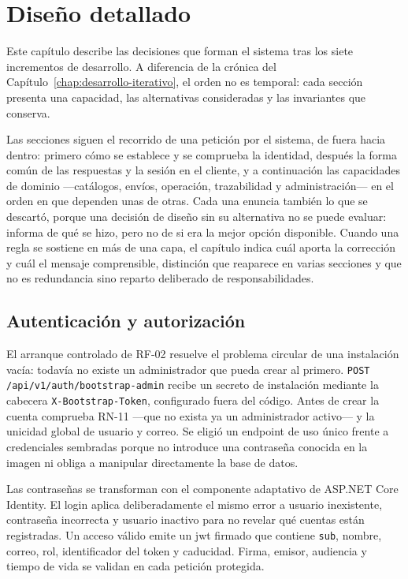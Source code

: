 \chapter{Diseño detallado}
\label{chap:diseno-detallado}

Este capítulo describe las decisiones que forman el sistema tras los siete incrementos de desarrollo. A diferencia de la crónica del Capítulo~\ref{chap:desarrollo-iterativo}, el orden no es temporal: cada sección presenta una capacidad, las alternativas consideradas y las invariantes que conserva.

Las secciones siguen el recorrido de una petición por el sistema, de fuera hacia dentro: primero cómo se establece y se comprueba la identidad, después la forma común de las respuestas y la sesión en el cliente, y a continuación las capacidades de dominio ---catálogos, envíos, operación, trazabilidad y administración--- en el orden en que dependen unas de otras. Cada una enuncia también lo que se descartó, porque una decisión de diseño sin su alternativa no se puede evaluar: informa de qué se hizo, pero no de si era la mejor opción disponible. Cuando una regla se sostiene en más de una capa, el capítulo indica cuál aporta la corrección y cuál el mensaje comprensible, distinción que reaparece en varias secciones y que no es redundancia sino reparto deliberado de responsabilidades.

\section{Autenticación y autorización}

El arranque controlado de RF-02 resuelve el problema circular de una instalación vacía: todavía no existe un administrador que pueda crear al primero. \texttt{POST /api/v1/auth/bootstrap-admin} recibe un secreto de instalación mediante la cabecera \texttt{X-Bootstrap-Token}, configurado fuera del código. Antes de crear la cuenta comprueba RN-11 ---que no exista ya un administrador activo--- y la unicidad global de usuario y correo. Se eligió un endpoint de uso único frente a credenciales sembradas porque no introduce una contraseña conocida en la imagen ni obliga a manipular directamente la base de datos.

Las contraseñas se transforman con el componente adaptativo de ASP.NET Core Identity. El login aplica deliberadamente el mismo error a usuario inexistente, contraseña incorrecta y usuario inactivo para no revelar qué cuentas están registradas. Un acceso válido emite un \gls{jwt} firmado que contiene \texttt{sub}, nombre, correo, rol, identificador del token y caducidad. Firma, emisor, audiencia y tiempo de vida se validan en cada petición protegida.

